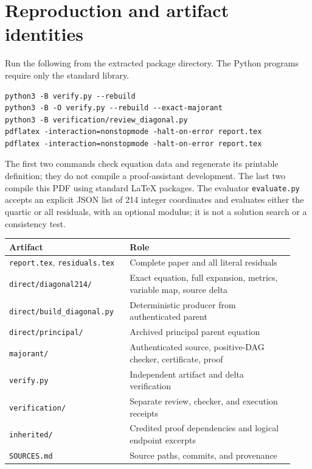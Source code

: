 \documentclass[11pt,a4paper]{article}
\theoremstyle{definition}
\newcommand{\file}[1]{\nolinkurl{#1}}
\begin{document}
\clearpage
\appendix
\section{Reproduction and artifact identities}\label{app:reproduce}

Run the following from the extracted package directory. The Python
programs require only the standard library.
\begin{lstlisting}
python3 -B verify.py --rebuild
python3 -B -O verify.py --rebuild --exact-majorant
python3 -B verification/review_diagonal.py
pdflatex -interaction=nonstopmode -halt-on-error report.tex
pdflatex -interaction=nonstopmode -halt-on-error report.tex
\end{lstlisting}
The first two commands check equation data and regenerate its printable
definition; they do not compile a proof-assistant development. The last
two compile this PDF using standard LaTeX packages. The evaluator
\file{evaluate.py} accepts an explicit JSON list of 214 integer
coordinates and evaluates either the quartic or all residuals, with
an optional modulus; it is not a solution search or a consistency test.

\begin{center}
\small
\begin{tabular}{p{0.39\linewidth}p{0.54\linewidth}}
\toprule
Artifact & Role\\
\midrule
\file{report.tex}, \file{residuals.tex} & Complete paper and all literal residuals\\
\file{direct/diagonal214/} & Exact equation, full expansion, metrics, variable map, source delta\\
\file{direct/build_diagonal.py} & Deterministic producer from authenticated parent\\
\file{direct/principal/} & Archived principal parent equation\\
\file{majorant/} & Authenticated source, positive-DAG checker, certificate, proof\\
\file{verify.py} & Independent artifact and delta verification\\
\file{verification/} & Separate review, checker, and execution receipts\\
\file{inherited/} & Credited proof dependencies and logical endpoint excerpts\\
\file{SOURCES.md} & Source paths, commits, and provenance\\
\bottomrule
\end{tabular}
\end{center}
\end{document}
